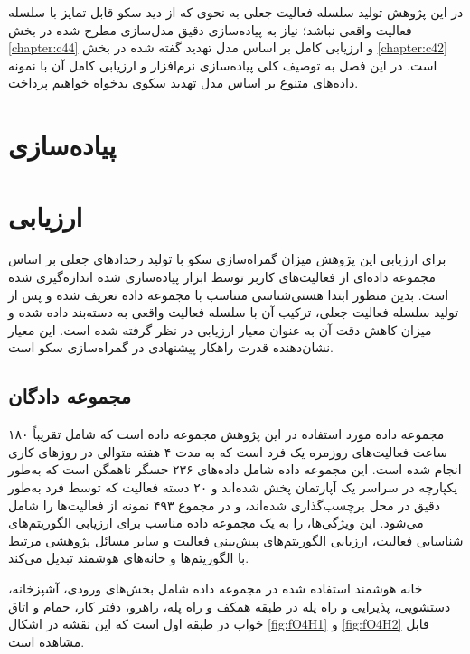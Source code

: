 
در این پژوهش تولید سلسله فعالیت جعلی به نحوی که از دید سکو قابل تمایز با سلسله فعالیت واقعی نباشد؛ نیاز به پیاده‌سازی دقیق مدل‌سازی مطرح شده در بخش \ref{chapter:c44} و ارزیابی کامل بر اساس مدل تهدید گفته شده در بخش \ref{chapter:c42} است. در این فصل به توصیف کلی پیاده‌سازی نرم‌افزار و ارزیابی کامل آن با نمونه داده‌های متنوع بر اساس مدل تهدید سکوی بدخواه خواهیم پرداخت.

\section{پیاده‌سازی}

\section{ارزیابی}

برای ارزیابی این پژوهش میزان گمراه‌سازی سکو با تولید رخدادهای جعلی بر اساس مجموعه داده‌ای از فعالیت‌های کاربر توسط ابزار پیاده‌سازی شده اندازه‌گیری شده است. بدین منظور ابتدا هستی‌شناسی متناسب با مجموعه داده تعریف شده و پس از تولید سلسله فعالیت جعلی، ترکیب آن با سلسله فعالیت واقعی به دسته‌بند داده شده و میزان کاهش دقت آن به عنوان معیار ارزیابی در نظر گرفته شده است. این معیار نشان‌دهنده‌ قدرت راهکار پیشنهادی در گمراه‌سازی سکو است.

\subsection{مجموعه دادگان}

مجموعه داده مورد استفاده در این پژوهش مجموعه داده  \cite{xyz6} است که شامل تقریباً ۱۸۰ ساعت فعالیت‌های روزمره یک فرد است که به مدت ۴ هفته متوالی در روزهای کاری انجام شده است. این مجموعه داده شامل داده‌های ۲۳۶ حسگر ناهمگن است که به‌طور یکپارچه در سراسر یک آپارتمان پخش شده‌اند و ۲۰ دسته فعالیت که توسط فرد به‌طور دقیق در محل برچسب‌گذاری شده‌اند، و در مجموع ۴۹۳ نمونه از فعالیت‌ها را شامل می‌شود. این ویژگی‌ها،  را به یک مجموعه داده مناسب برای ارزیابی الگوریتم‌های شناسایی فعالیت، ارزیابی الگوریتم‌های پیش‌بینی فعالیت و سایر مسائل پژوهشی مرتبط با الگوریتم‌ها و خانه‌های هوشمند تبدیل می‌کند.

خانه هوشمند استفاده شده در مجموعه داده  شامل بخش‌های ورودی، آشپزخانه، دستشویی، پذیرایی و راه پله در طبقه همکف و راه پله، راهرو، دفتر کار، حمام و اتاق خواب در طبقه اول است که این نقشه در اشکال \ref{fig:fO4H1} و  \ref{fig:fO4H2} قابل مشاهده است.


